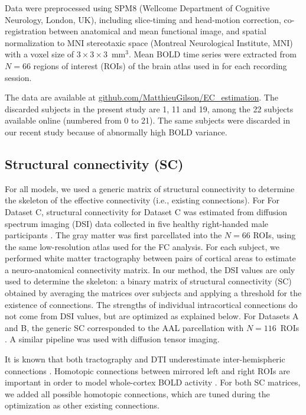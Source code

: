 \documentclass{article}
\begin{document}
Data were preprocessed using SPM8 (Wellcome Department of Cognitive Neurology, London, UK), including slice-timing and head-motion correction, co-registration between anatomical and mean functional image, and spatial normalization to MNI stereotaxic space (Montreal Neurological Institute, MNI) with a voxel size of $3 \times 3 \times 3$~mm$^3$. 
Mean BOLD time series were extracted from $N = 66$ regions of interest (ROIs) of the brain atlas used in \cite{Hagmann_PB_2008} for each recording session. 

The data are available at \url{github.com/MatthieuGilson/EC_estimation}.
The discarded subjects in the present study are 1, 11 and 19, among the 22 subjects available online (numbered from 0 to 21). The same subjects were discarded in our recent study \cite{Gilson_NeIm_2017} because of abnormally high BOLD variance.


\subsection{Structural connectivity (SC)}

For all models, we used a generic matrix of structural connectivity to determine the skeleton of the effective connectivity (i.e., existing connections). For For Dataset C, structural connectivity for Dataset C was estimated from diffusion spectrum imaging (DSI) data collected in five healthy right-handed male participants \cite{Hagmann_PB_2008}. The gray matter was first parcellated into the $N = 66$ ROIs, using the same low-resolution atlas used for the FC analysis. For each subject, we performed white matter tractography between pairs of cortical areas to estimate a neuro-anatomical connectivity matrix. In our method, the DSI values are only used to determine the skeleton: a binary matrix of structural connectivity (SC) obtained by averaging the matrices over subjects and applying a threshold for the existence of connections. The strengths of individual intracortical connections do not come from DSI values, but are optimized as explained below. For Datasets A and B, the generic SC corresponded to the AAL parcellation with $N = 116$~ROIs \cite{Tzourio2002}. A similar pipeline was used with diffusion tensor imaging.

It is known that both tractography and DTI underestimate inter-hemispheric connections \cite{Hagmann_PB_2008}. Homotopic connections between mirrored left and right ROIs are important in order to model whole-cortex BOLD activity \cite{Messe_PCB_2014}. For both SC matrices, we added all possible homotopic connections, which are tuned during the optimization as other existing connections. 
\end{document}
